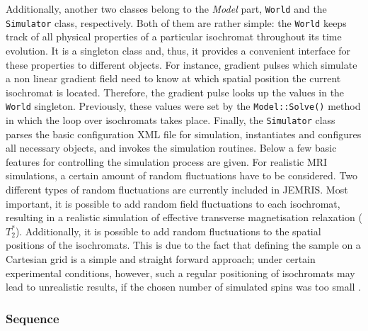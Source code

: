 \documentclass[journal,onecolumn,12pt]{IEEEtran}
\begin{document}
Additionally, another two classes belong to the {\it Model} part, \verb+World+ and the \verb+Simulator+ class,
respectively. Both of them are rather simple: the \verb+World+ keeps track of all physical properties of a particular
isochromat throughout its time evolution. It is a singleton class and, thus, it provides a convenient interface for
these properties to different objects. For instance, gradient pulses which simulate a non linear gradient field need to
know at which spatial position the current isochromat is located. Therefore, the gradient pulse looks up the values in
the \verb+World+ singleton. Previously, these values were set by the \verb+Model::Solve()+ method in which the loop over
isochromats takes place. Finally, the \verb+Simulator+ class parses the basic configuration XML file for simulation,
instantiates and configures all necessary objects, and invokes the simulation routines. Below a few basic features for
controlling the simulation process are given. For realistic MRI simulations, a certain amount of random fluctuations
have to be considered. Two different types of random fluctuations are currently included in JEMRIS. Most important, it
is possible to add random field fluctuations to each isochromat, resulting in a realistic simulation of effective
transverse magnetisation relaxation ($T_{2}^{*}$). Additionally, it is possible to add random fluctuations to the
spatial positions of the isochromats. This is due to the fact that defining the sample on a Cartesian grid is a simple
and straight forward approach; under certain experimental conditions, however, such a regular positioning of isochromats
may lead to unrealistic results, if the chosen number of simulated spins was too small \cite{sharp}.



\subsubsection{Sequence}\label{sssec:seq}
\end{document}
